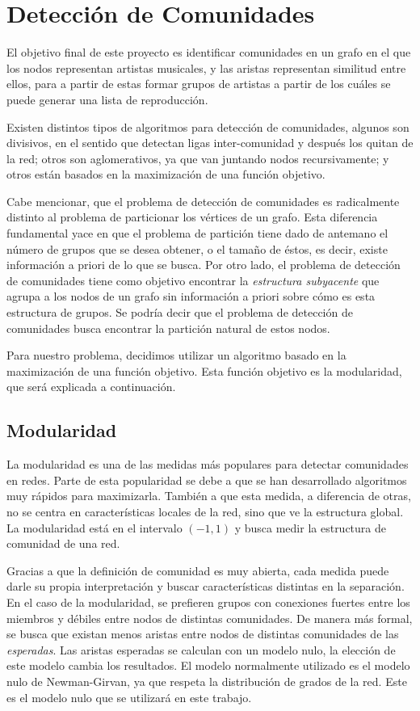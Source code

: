 \documentclass[conference]{IEEEtran}
\begin{document}
\section{Detección de Comunidades}

 
El objetivo final de este proyecto es identificar comunidades en un grafo en el que los nodos representan artistas musicales, y las aristas representan similitud entre ellos, para a partir de estas formar grupos de artistas a partir de los cuáles se puede generar una lista de reproducción.

Existen distintos tipos de algoritmos para detección de comunidades, algunos son divisivos, en el sentido que detectan ligas inter-comunidad y después los quitan de la red; otros son aglomerativos, ya que van juntando nodos recursivamente; y otros están basados en la maximización de una función objetivo.

Cabe mencionar, que el problema de detección de comunidades es radicalmente distinto al problema de particionar los vértices de un grafo. Esta diferencia fundamental yace en que el problema de partición tiene dado de antemano el número de grupos que se desea obtener, o el tamaño de éstos, es decir, existe información a priori de lo que se busca. Por otro lado, el problema de detección de comunidades tiene como objetivo encontrar la \textit{estructura subyacente} que agrupa a los nodos de un grafo sin información a priori sobre cómo es esta estructura de grupos. Se podría decir que el problema de detección de comunidades busca encontrar la partición natural de estos nodos.

Para nuestro problema, decidimos utilizar un algoritmo basado en la maximización de una función objetivo. Esta función objetivo es la modularidad, que será explicada a continuación. 




\subsection{Modularidad}

La modularidad es una de las medidas más populares para detectar comunidades en redes. Parte de esta popularidad se debe a que se han desarrollado algoritmos muy rápidos para maximizarla. También a que esta medida, a diferencia de otras, no se centra en características locales de la red, sino que ve la estructura global. La modularidad está en el intervalo $(-1,1)$ y busca medir la estructura de comunidad de una red.

Gracias a que la definición de comunidad es muy abierta, cada medida puede darle su propia interpretación y buscar características distintas en la separación. En el caso de la modularidad, se prefieren grupos con conexiones fuertes entre los miembros y débiles entre nodos de distintas comunidades. De manera más formal, se busca que existan menos aristas entre nodos de distintas comunidades de las \textit{esperadas}. Las aristas esperadas se calculan con un modelo nulo, la elección de este modelo cambia los resultados. El modelo normalmente utilizado es el modelo nulo de Newman-Girvan, ya que respeta la distribución de grados de la red. Este es el modelo nulo que se utilizará en este trabajo.
\end{document}

